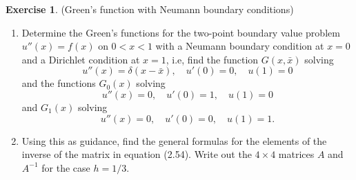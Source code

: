 \documentclass[12pt]{article}
\theoremstyle{definition}
\newtheorem{exer}{Exercise}
\theoremstyle{remark}
\begin{document}
\newpage

\begin{exer}
 (Green's function with Neumann boundary conditions)
\begin{enumerate}
\item
Determine the Green's functions for the two-point boundary
value problem $u''(x) = f(x)$ on $0<x<1$ with a Neumann boundary condition
at $x=0$ and a Dirichlet condition at $x=1$, i.e, find the function
$G(x,\bar x)$ solving
\[
u''(x) = \delta(x-\bar x), \quad u'(0)=0, \quad u(1)=0
\]
and the functions $G_0(x)$ solving
\[
u''(x) = 0, \quad u'(0)=1, \quad u(1)=0
\]
and $G_1(x)$ solving
\[
u''(x) = 0, \quad u'(0)=0, \quad u(1)=1.
\]
\item
Using this as guidance, find the general formulas for the elements of the
inverse of the matrix in equation (2.54).  Write out the $4\times 4$ matrices
$A$ and $A^{-1}$ for the case $h=1/3$.
\end{enumerate}
\end{exer}
\end{document}

